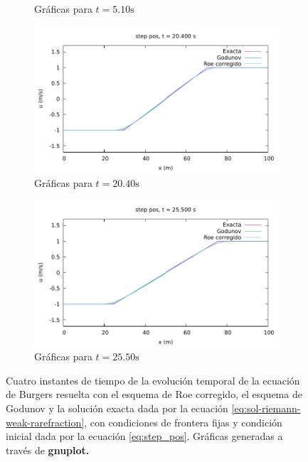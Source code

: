\documentclass[12pt]{article}
\begin{document}
\begin{figure}[h]
\begin{subfigure}[b]{0.4\textwidth}
			\caption*{Gráficas para $t=5.10\unit{\second}$}
		\end{subfigure}
		\par\medskip
		\begin{subfigure}[b]{0.4\textwidth}
			\includegraphics[width=\textwidth]{../burgers1DVF/results/sol_fijas/step_pos-roe-fix/680.pdf}
			\caption*{Gráficas para $t=20.40\unit{\second}$}
		\end{subfigure}
		\hfill
		\begin{subfigure}[b]{0.4\textwidth}
			\includegraphics[width=\textwidth]{../burgers1DVF/results/sol_fijas/step_pos-roe-fix//850.pdf}
			\caption*{Gráficas para $t=25.50\unit{\second}$}
		\end{subfigure}
		\caption{Cuatro instantes de tiempo de la evolución temporal de la ecuación de Burgers resuelta con el esquema de Roe corregido, el esquema de Godunov y la solución exacta dada por la ecuación \ref{eq:sol-riemann-weak-rarefraction}, con condiciones de frontera fijas y condición inicial dada por la ecuación \ref{eq:step_pos}. Gráficas generadas a través de \textbf{gnuplot.}}
		\label{fig:step_pos-roe-fix}
	\end{figure}
		
\end{document}
